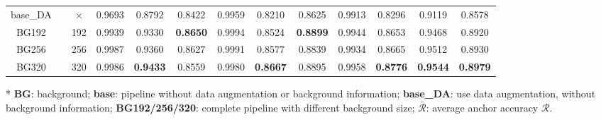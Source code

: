 \documentclass[letterpaper, 10 pt, conference]{ieeeconf}  %
\begin{document}
\begin{table}
\begin{threeparttable}
\begin{tabular}{ccc|ccc|ccc|ccc!{\color{black}\vrule}c}
				base\_DA               & \checkmark                          & $\times$                          & 0.9693 & {}0.8792          & {}0.8422              & 0.9959 & {}0.8210          & {}0.8625          & 0.9913 & {}0.8296              & {}0.9119              & {}0.8578           \\
				BG192                  & \checkmark                          & 192                         & 0.9939 & {}0.9330          & {}\textbf{0.8650}  & 0.9994 & {}0.8524           & {}\textbf{0.8899}  & 0.9944 & {}0.8653           & {}0.9468            & {}0.8920           \\
				BG256                  & \checkmark                          & 256                         & 0.9987 & {}0.9360          & {}0.8627          & 0.9991 & {}0.8577          & {}0.8839           & 0.9934 & {}0.8665           & {}0.9512          & {}0.8930           \\
				BG320                  & \checkmark                          & 320                         & 0.9986 & {}\textbf{0.9433}  & {}0.8559          & 0.9980 & {}\textbf{0.8667}  & {}0.8895           & 0.9958 & {}\textbf{0.8776}  & {}\textbf{0.9544}  & {}\textbf{0.8979}   \\
				\hline
			\end{tabular}
			\begin{tablenotes}
				\footnotesize
				\item[*] \textbf{BG}: background; \textbf{base}: pipeline without data augmentation or background information; \textbf{base\_DA}: use data augmentation, without background information; \textbf{BG192/256/320}: complete pipeline with different background size; \textbf{$\bar{\mathcal{R}}$}: average anchor accuracy $\mathcal{R}$.
			\end{tablenotes}
		\end{threeparttable}
		\vspace{-3mm}
	\end{table}
	
\end{document}
